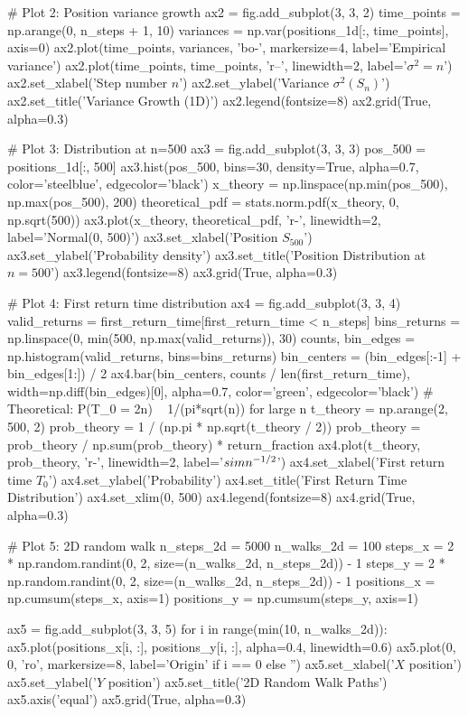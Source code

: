 \documentclass[a4paper, 11pt]{article}
\begin{document}
\begin{pycode}
# Plot 2: Position variance growth
ax2 = fig.add_subplot(3, 3, 2)
time_points = np.arange(0, n_steps + 1, 10)
variances = np.var(positions_1d[:, time_points], axis=0)
ax2.plot(time_points, variances, 'bo-', markersize=4, label='Empirical variance')
ax2.plot(time_points, time_points, 'r--', linewidth=2, label='$\sigma^2 = n$')
ax2.set_xlabel('Step number $n$')
ax2.set_ylabel('Variance $\sigma^2(S_n)$')
ax2.set_title('Variance Growth (1D)')
ax2.legend(fontsize=8)
ax2.grid(True, alpha=0.3)

# Plot 3: Distribution at n=500
ax3 = fig.add_subplot(3, 3, 3)
pos_500 = positions_1d[:, 500]
ax3.hist(pos_500, bins=30, density=True, alpha=0.7, color='steelblue', edgecolor='black')
x_theory = np.linspace(np.min(pos_500), np.max(pos_500), 200)
theoretical_pdf = stats.norm.pdf(x_theory, 0, np.sqrt(500))
ax3.plot(x_theory, theoretical_pdf, 'r-', linewidth=2, label='Normal(0, 500)')
ax3.set_xlabel('Position $S_{500}$')
ax3.set_ylabel('Probability density')
ax3.set_title('Position Distribution at $n=500$')
ax3.legend(fontsize=8)
ax3.grid(True, alpha=0.3)

# Plot 4: First return time distribution
ax4 = fig.add_subplot(3, 3, 4)
valid_returns = first_return_time[first_return_time < n_steps]
bins_returns = np.linspace(0, min(500, np.max(valid_returns)), 30)
counts, bin_edges = np.histogram(valid_returns, bins=bins_returns)
bin_centers = (bin_edges[:-1] + bin_edges[1:]) / 2
ax4.bar(bin_centers, counts / len(first_return_time), width=np.diff(bin_edges)[0],
        alpha=0.7, color='green', edgecolor='black')
# Theoretical: P(T_0 = 2n) ~ 1/(pi*sqrt(n)) for large n
t_theory = np.arange(2, 500, 2)
prob_theory = 1 / (np.pi * np.sqrt(t_theory / 2))
prob_theory = prob_theory / np.sum(prob_theory) * return_fraction
ax4.plot(t_theory, prob_theory, 'r-', linewidth=2, label='$\\sim n^{-1/2}$')
ax4.set_xlabel('First return time $T_0$')
ax4.set_ylabel('Probability')
ax4.set_title('First Return Time Distribution')
ax4.set_xlim(0, 500)
ax4.legend(fontsize=8)
ax4.grid(True, alpha=0.3)

# Plot 5: 2D random walk
n_steps_2d = 5000
n_walks_2d = 100
steps_x = 2 * np.random.randint(0, 2, size=(n_walks_2d, n_steps_2d)) - 1
steps_y = 2 * np.random.randint(0, 2, size=(n_walks_2d, n_steps_2d)) - 1
positions_x = np.cumsum(steps_x, axis=1)
positions_y = np.cumsum(steps_y, axis=1)

ax5 = fig.add_subplot(3, 3, 5)
for i in range(min(10, n_walks_2d)):
    ax5.plot(positions_x[i, :], positions_y[i, :], alpha=0.4, linewidth=0.6)
    ax5.plot(0, 0, 'ro', markersize=8, label='Origin' if i == 0 else '')
ax5.set_xlabel('$X$ position')
ax5.set_ylabel('$Y$ position')
ax5.set_title('2D Random Walk Paths')
ax5.axis('equal')
ax5.grid(True, alpha=0.3)


\end{pycode}
\end{document}
